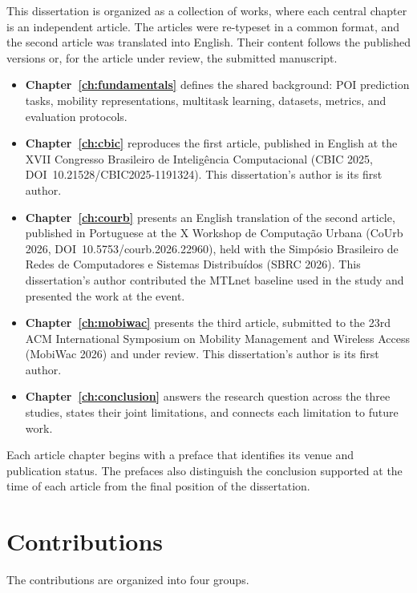 This dissertation is organized as a collection of works, where each central chapter is an
independent article. The articles were re-typeset in a common format, and the second
article was translated into English. Their content follows the published versions or,
for the article under review, the submitted manuscript.
\begin{itemize}
    \item \textbf{Chapter~\ref{ch:fundamentals}} defines the shared background: POI
    prediction tasks, mobility representations, multitask learning, datasets,
    metrics, and evaluation protocols.
    \item \textbf{Chapter~\ref{ch:cbic}} reproduces the first article, published in
    English at the XVII Congresso Brasileiro de Intelig\^encia Computacional
    (CBIC 2025, DOI~10.21528/CBIC2025-1191324). This dissertation's author is its
    first author.
    \item \textbf{Chapter~\ref{ch:courb}} presents an English translation of the second
    article, published in Portuguese at the X Workshop de Computa\c{c}\~ao Urbana
    (CoUrb 2026, DOI~10.5753/courb.2026.22960), held with the Simp\'osio
    Brasileiro de Redes de Computadores e Sistemas Distribu\'idos (SBRC 2026).
    This dissertation's author contributed the MTLnet baseline used in the study
    and presented the work at the event.
    \item \textbf{Chapter~\ref{ch:mobiwac}} presents the third article, submitted to the
    23rd ACM International Symposium on Mobility Management and Wireless Access
    (MobiWac 2026) and under review. This dissertation's author is its first
    author.
    \item \textbf{Chapter~\ref{ch:conclusion}} answers the research question across the
    three studies, states their joint limitations, and connects each limitation
    to future work.
\end{itemize}

Each article chapter begins with a preface that identifies its venue and publication
status. The prefaces also distinguish the conclusion supported at the time of each
article from the final position of the dissertation.


\section{Contributions}
\label{sec:intro:contributions}

The contributions are organized into four groups.

